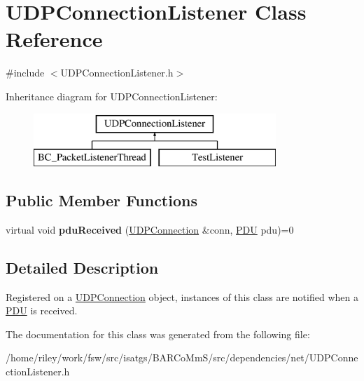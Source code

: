 \hypertarget{class_u_d_p_connection_listener}{}\section{U\+D\+P\+Connection\+Listener Class Reference}
\label{class_u_d_p_connection_listener}


{\ttfamily \#include $<$U\+D\+P\+Connection\+Listener.\+h$>$}

Inheritance diagram for U\+D\+P\+Connection\+Listener\+:\begin{figure}[H]
\begin{center}
\leavevmode
\includegraphics[height=2.000000cm]{class_u_d_p_connection_listener}
\end{center}
\end{figure}
\subsection*{Public Member Functions}
\begin{DoxyCompactItemize}
\item 
virtual void {\bfseries pdu\+Received} (\hyperlink{class_u_d_p_connection}{U\+D\+P\+Connection} \&conn, \hyperlink{class_p_d_u}{P\+DU} pdu)=0\hypertarget{class_u_d_p_connection_listener_a6c4f91d754491179bd1f9f8219ca6e19}{}\label{class_u_d_p_connection_listener_a6c4f91d754491179bd1f9f8219ca6e19}

\end{DoxyCompactItemize}


\subsection{Detailed Description}
Registered on a \hyperlink{class_u_d_p_connection}{U\+D\+P\+Connection} object, instances of this class are notified when a \hyperlink{class_p_d_u}{P\+DU} is received. 

The documentation for this class was generated from the following file\+:\begin{DoxyCompactItemize}
\item 
/home/riley/work/fsw/src/isatgs/\+B\+A\+R\+Co\+Mm\+S/src/dependencies/net/U\+D\+P\+Connection\+Listener.\+h\end{DoxyCompactItemize}
